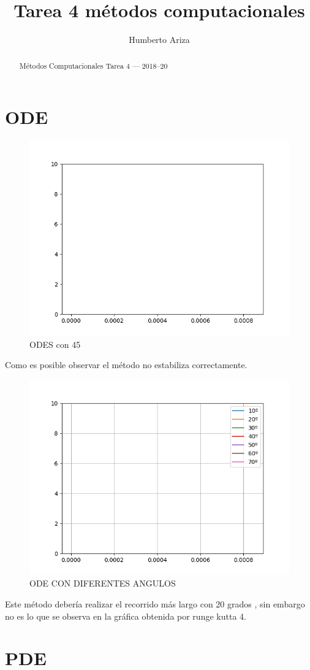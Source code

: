 \documentclass[12pt]{article}
\title{Tarea 4 métodos computacionales}
\begin{document}
\author{Humberto Ariza}


\begin{abstract}
    Métodos Computacionales
    Tarea 4 — 2018–20
\end{abstract}

\section{ODE}

\begin{figure}
\includegraphics{ODES45.png}
\caption{ODES con 45}
\end{figure}

Como es posible observar el método no estabiliza correctamente. 

\begin{figure}
\includegraphics{ODESANGULOS.png}
\caption{ODE CON DIFERENTES ANGULOS}
\end{figure}
Este método debería realizar el recorrido más largo con 20 grados , sin embargo no es lo que se observa en la gráfica obtenida por runge kutta 4.


\section{PDE}
\end{document}
